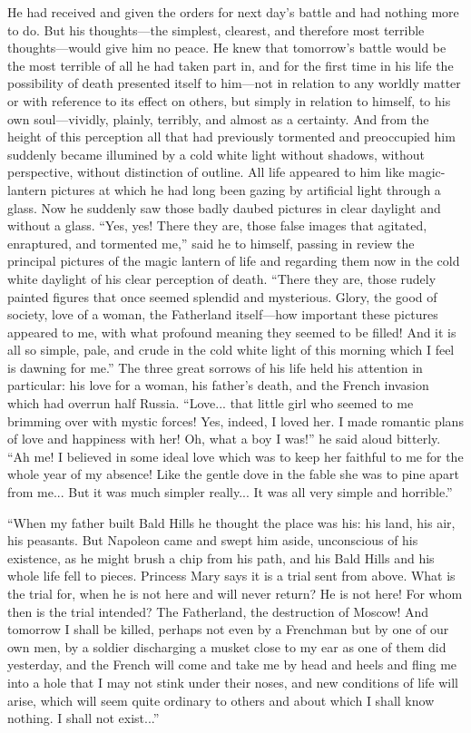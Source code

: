 He had received and given the orders for next day's battle and
had nothing more to do. But his thoughts---the simplest,
clearest, and therefore most terrible thoughts---would give him
no peace. He knew that tomorrow's battle would be the most
terrible of all he had taken part in, and for the first time in
his life the possibility of death presented itself to him---not
in relation to any worldly matter or with reference to its effect
on others, but simply in relation to himself, to his own
soul---vividly, plainly, terribly, and almost as a certainty. And
from the height of this perception all that had previously
tormented and preoccupied him suddenly became illumined by a cold
white light without shadows, without perspective, without
distinction of outline. All life appeared to him like
magic-lantern pictures at which he had long been gazing by
artificial light through a glass. Now he suddenly saw those badly
daubed pictures in clear daylight and without a glass. ``Yes,
yes!  There they are, those false images that agitated,
enraptured, and tormented me,'' said he to himself, passing in
review the principal pictures of the magic lantern of life and
regarding them now in the cold white daylight of his clear
perception of death. ``There they are, those rudely painted
figures that once seemed splendid and mysterious. Glory, the good
of society, love of a woman, the Fatherland itself---how
important these pictures appeared to me, with what profound
meaning they seemed to be filled! And it is all so simple, pale,
and crude in the cold white light of this morning which I feel is
dawning for me.'' The three great sorrows of his life held his
attention in particular: his love for a woman, his father's
death, and the French invasion which had overrun half
Russia. ``Love... that little girl who seemed to me brimming over
with mystic forces! Yes, indeed, I loved her. I made romantic
plans of love and happiness with her! Oh, what a boy I was!'' he
said aloud bitterly. ``Ah me! I believed in some ideal love which
was to keep her faithful to me for the whole year of my absence!
Like the gentle dove in the fable she was to pine apart from
me... But it was much simpler really... It was all very simple
and horrible.''

``When my father built Bald Hills he thought the place was his:
his land, his air, his peasants. But Napoleon came and swept him
aside, unconscious of his existence, as he might brush a chip
from his path, and his Bald Hills and his whole life fell to
pieces. Princess Mary says it is a trial sent from above. What is
the trial for, when he is not here and will never return? He is
not here! For whom then is the trial intended? The Fatherland,
the destruction of Moscow! And tomorrow I shall be killed,
perhaps not even by a Frenchman but by one of our own men, by a
soldier discharging a musket close to my ear as one of them did
yesterday, and the French will come and take me by head and heels
and fling me into a hole that I may not stink under their noses,
and new conditions of life will arise, which will seem quite
ordinary to others and about which I shall know nothing. I shall
not exist...''

